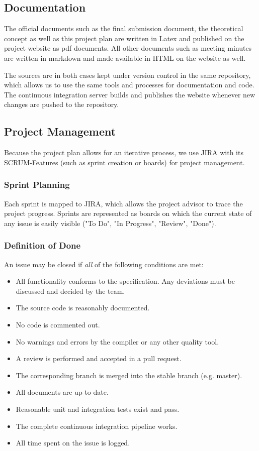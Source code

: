 \documentclass[a4paper]{article}
\begin{document}
\subsection{Documentation}
The official documents such as the final submission document, the theoretical concept as well as this project plan are written in Latex and published on the project website as pdf documents. All other documents such as meeting minutes are written in markdown and made available in HTML on the website as well.

The sources are in both cases kept under version control in the same repository, which allows us to use the same tools and processes for documentation and code. The continuous integration server builds and publishes the website whenever new changes are pushed to the repository.

\subsection{Project Management}
Because the project plan allows for an iterative process, we use JIRA with its SCRUM-Features (such as sprint creation or boards) for project management.

\subsubsection{Sprint Planning}
Each sprint is mapped to JIRA, which allows the project advisor to trace the project progress. Sprints are represented as boards on which the current state of any issue is easily visible ("To Do", "In Progress", "Review", "Done").


\subsubsection{Definition of Done}
An issue may be closed if \emph{all} of the following conditions are met:

\begin{itemize}
	\item All functionality conforms to the specification. Any deviations must be discussed and decided by the team.
	\item The source code is reasonably documented.
	\item No code is commented out.
	\item No warnings and errors by the compiler or any other quality tool.
	\item A review is performed and accepted in a pull request.
	\item The corresponding branch is merged into the stable branch (e.g. master).
	\item All documents are up to date.
	\item Reasonable unit and integration tests exist and pass.
	\item The complete continuous integration pipeline works.
	\item All time spent on the issue is logged.
\end{itemize}
\end{document}
